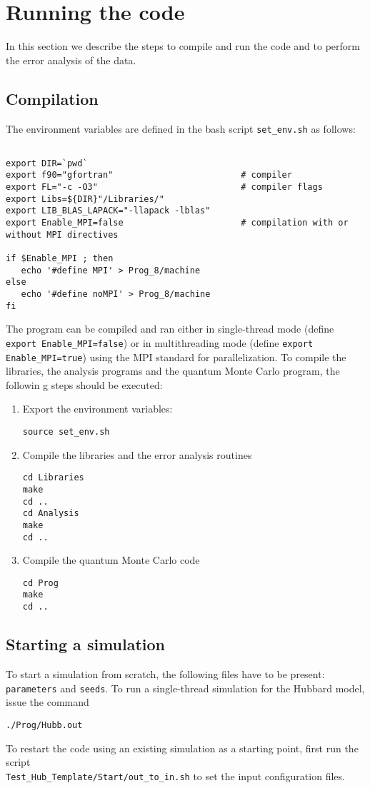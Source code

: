 \section{Running the code}\label{sec:running}
In this section we describe the steps to compile and run the code and to perform the error analysis of the data.


\subsection{Compilation}
The environment variables are defined in the bash script \texttt{set\_env.sh} as follows:
\lstset{style=custombash}
\begin{lstlisting}

export DIR=`pwd`
export f90="gfortran"                         # compiler
export FL="-c -O3"                            # compiler flags
export Libs=${DIR}"/Libraries/"
export LIB_BLAS_LAPACK="-llapack -lblas"
export Enable_MPI=false                       # compilation with or without MPI directives

if $Enable_MPI ; then
   echo '#define MPI' > Prog_8/machine
else
   echo '#define noMPI' > Prog_8/machine
fi

\end{lstlisting}
The program can be compiled and ran either in single-thread mode (define \texttt{export Enable\_MPI=false}) or 
in multithreading mode (define \texttt{export Enable\_MPI=true}) using the MPI standard for parallelization.
To compile the libraries, the analysis programs and the quantum Monte Carlo program, the followin	g steps should be executed:
\begin{enumerate}
\item Export  the environment variables:
\begin{verbatim}
source set_env.sh
\end{verbatim}
\item Compile the libraries and the error analysis routines
\begin{verbatim}
cd Libraries
make
cd ..
cd Analysis
make
cd ..
\end{verbatim}
\item Compile the quantum Monte Carlo code
\begin{verbatim}
cd Prog
make
cd ..
\end{verbatim}
\end{enumerate}


\subsection{Starting a simulation}
To start a simulation from scratch, the following files have to be present: \texttt{parameters} and \texttt{seeds}. 
To run a single-thread simulation for the Hubbard model, issue the command
\begin{verbatim}
./Prog/Hubb.out
\end{verbatim}
To restart the code using an existing simulation as a starting point, first run the script\\ \texttt{Test\_Hub\_Template/Start/out\_to\_in.sh} to set 
the input configuration files.

